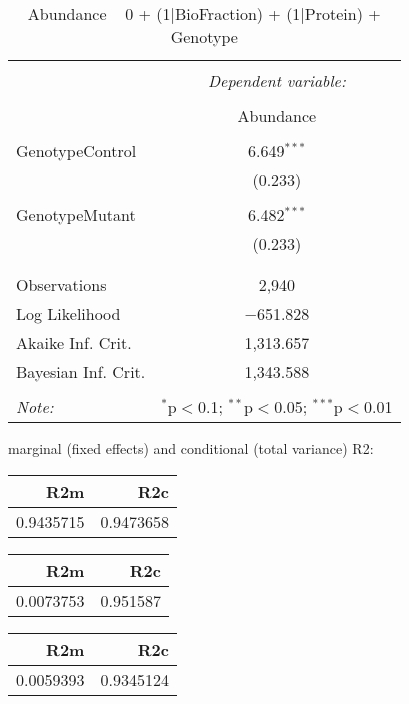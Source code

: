 \documentclass[11pt]{report}
\begin{document}
\begin{table}[!htbp] \centering 
  \caption{Abundance ~ 0 + (1|BioFraction) + (1|Protein) + Genotype} 
  \label{} 
\begin{tabular}{@{\extracolsep{5pt}}lc} 
\\[-1.8ex]\hline 
\hline \\[-1.8ex] 
 & \multicolumn{1}{c}{\textit{Dependent variable:}} \\ 
\cline{2-2} 
\\[-1.8ex] & Abundance \\ 
\hline \\[-1.8ex] 
 GenotypeControl & 6.649$^{***}$ \\ 
  & (0.233) \\ 
  & \\ 
 GenotypeMutant & 6.482$^{***}$ \\ 
  & (0.233) \\ 
  & \\ 
\hline \\[-1.8ex] 
Observations & 2,940 \\ 
Log Likelihood & $-$651.828 \\ 
Akaike Inf. Crit. & 1,313.657 \\ 
Bayesian Inf. Crit. & 1,343.588 \\ 
\hline 
\hline \\[-1.8ex] 
\textit{Note:}  & \multicolumn{1}{r}{$^{*}$p$<$0.1; $^{**}$p$<$0.05; $^{***}$p$<$0.01} \\ 
\end{tabular} 
\end{table} 
marginal (fixed effects) and conditional (total variance) R2:

\begin{tabular}{r|r}
\hline
R2m & R2c\\
\hline
0.9435715 & 0.9473658\\
\hline
\end{tabular}

\begin{tabular}{r|r}
\hline
R2m & R2c\\
\hline
0.0073753 & 0.951587\\
\hline
\end{tabular}

\begin{tabular}{r|r}
\hline
R2m & R2c\\
\hline
0.0059393 & 0.9345124\\
\hline
\end{tabular}
\end{document}
